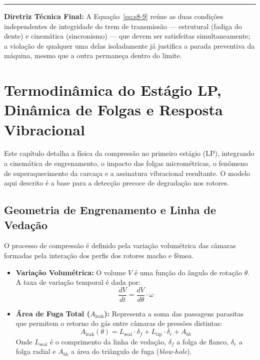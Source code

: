 \documentclass[12pt,a4paper]{article}
\numberwithin{equation}{section}
\numberwithin{table}{section}
\numberwithin{figure}{section}
\begin{document}
	\vspace{1em}
	\hrule
	\vspace{1em}

	\textbf{Diretriz Técnica Final:} A Equação~\eqref{eq:s8-9} reúne as duas condições independentes de integridade do trem de transmissão — estrutural (fadiga do dente) e cinemática (sincronismo) — que devem ser satisfeitas simultaneamente; a violação de qualquer uma delas isoladamente já justifica a parada preventiva da máquina, mesmo que a outra permaneça dentro do limite.

	
	
	\section{\textbf{Termodinâmica do Estágio LP, Dinâmica de Folgas e Resposta Vibracional}}
	
	Este capítulo detalha a física da compressão no primeiro estágio (LP), integrando a cinemática de engrenamento, o impacto das folgas micrométricas, o fenômeno de superaquecimento da carcaça e a assinatura vibracional resultante. O modelo aqui descrito é a base para a detecção precoce de degradação nos rotores.
	
	\subsection{\textbf{Geometria de Engrenamento e Linha de Vedação}}
	O processo de compressão é definido pela variação volumétrica das câmaras formadas pela interação dos perfis dos rotores macho e fêmea.
	\begin{itemize}
		\item \textbf{Variação Volumétrica:} O volume $V$ é uma função do ângulo de rotação $\theta$. A taxa de variação temporal é dada por:
		\begin{equation}\label{eq:s9-1}
 \frac{dV}{dt} = \frac{dV}{d\theta} \cdot \omega 
\end{equation}
		\item \textbf{Área de Fuga Total ($A_{\text{leak}}$):} Representa a soma das passagens parasitas que permitem o retorno do gás entre câmaras de pressões distintas:
		\begin{equation}\label{eq:s9-2}
 A_{\text{leak}}(\theta) = L_{\text{seal}} \cdot \delta_f + L_{\text{tip}} \cdot \delta_r + A_{bh} 
\end{equation}
		Onde $L_{\text{seal}}$ é o comprimento da linha de vedação, $\delta_f$ a folga de flanco, $\delta_r$ a folga radial e $A_{bh}$ a área do triângulo de fuga (\textit{blow-hole}).
	\end{itemize}
	
\end{document}

